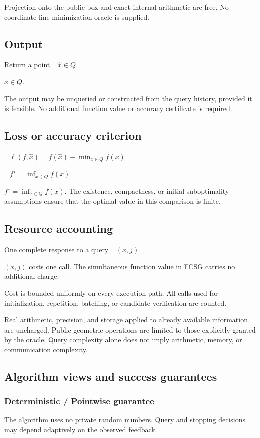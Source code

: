 \documentclass[10pt,a4paper]{article}
\newcommand{\AtlasMath}[1]{\par\begingroup\centering\setbox0=\hbox{$\displaystyle #1$}\ifdim\wd0>1.4\linewidth\typeout{ATLAS WIDE FORMULA: \the\wd0}\fi\ifdim\wd0>\linewidth\resizebox{\linewidth}{!}{\box0}\else\box0\fi\par\endgroup}
\newcommand{\AtlasInlineMath}[1]{\begingroup\setbox0=\hbox{$#1$}\ifdim\wd0>.4\linewidth\endgroup\AtlasMath{#1}\else\endgroup$#1$\fi}
\begin{document}
Projection onto the public box and exact internal arithmetic are free. No coordinate line-minimization oracle is supplied.

\subsection{Output}
Return a point \AtlasInlineMath{\widehat x\in Q}.

The output may be unqueried or constructed from the query history, provided it is feasible. No additional function value or accuracy certificate is required.

\subsection{Loss or accuracy criterion}

\AtlasMath{\ell(f,\widehat{x})=f(\widehat{x})-\min_{x\in Q}f(x)}


\AtlasInlineMath{f^\star=\inf_{x\in Q}f(x)}. The existence, compactness, or initial-suboptimality assumptions ensure that the optimal value in this comparison is finite.

\subsection{Resource accounting}
One complete response to a query \AtlasInlineMath{(x,j)} costs one call. The simultaneous function value in FCSG carries no additional charge.

Cost is bounded uniformly on every execution path. All calls used for initialization, repetition, batching, or candidate verification are counted.

Real arithmetic, precision, and storage applied to already available information are uncharged. Public geometric operations are limited to those explicitly granted by the oracle. Query complexity alone does not imply arithmetic, memory, or communication complexity.

\subsection{Algorithm views and success guarantees}
\subsubsection{Deterministic / Pointwise guarantee}
The algorithm uses no private random numbers. Query and stopping decisions may depend adaptively on the observed feedback.
\end{document}
